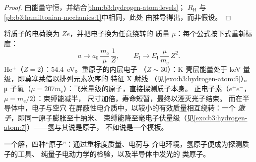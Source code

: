 \begin{proof}
由能量守恒，并结合\cref{thm:b3:hydrogen-atom:levels}；
$R_{\text{H}}$ 与\cref{pb:b3:hamiltonian-mechanics:1}中相同，此处
由推导得出，而非假设。
\end{proof}

\begin{example}\label{ex:b3:hydrogen-atom:scaling}
将质子的电荷换为 $Ze$，并把电子换为任意绕转的
质量 $\mu$：每个公式按下式重新标度：
\[
a \to a_0\,\frac{m_{\text{e}}}{\mu}\,\frac1Z , \qquad
E_{\text{I}} \to E_{\text{I}}\,\frac{\mu}{m_{\text{e}}}\,Z^2 .
\]
He$^+$（$Z = 2$）：\qty{54.4}{eV}。重原子的内层电子
（$Z \sim 30$）：K 壳层能量处于 keV 量级，即莫塞莱借以排列元素次序的
特征 X 射线
（见\cref{exo:b3:hydrogen-atom:5}）。μ 子氢（$\mu = 207
m_{\text{e}}$）：飞米量级的原子，直接探测质子本身。
正电子素（$e^+e^-$，$\mu = m_{\text{e}}/2$）：束缚能减半，
尺寸加倍，寿命短暂，最终以湮灭光子结束。
而在半导体中，电子与空穴
在屏蔽性电介质中，以较小的有效质量相互绕转：一个
\emph{激子}，即同一原子膨胀至十纳米、
束缚能降至毫电子伏量级（见\cref{exo:b3:hydrogen-atom:7}）——氢与其说是原子，
不如说是一个模板。
\end{example}

\begin{omfigure}

{\small 一个解，四种“原子”：通过重标度质量、电荷与
介电环境，氢原子便成为探测质子的工具、
纯量子电动力学的检验，以及半导体中发光的
类原子。}
\end{omfigure}

